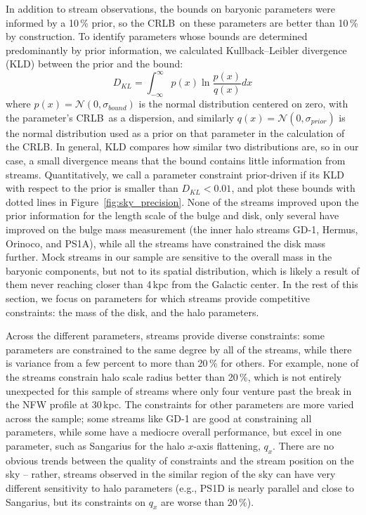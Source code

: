 \documentclass[modern]{aastex61}
\newcommand{\acronym}[1]{{\small{#1}}}
\newcommand{\CRLB}{\acronym{CRLB}}
\begin{document}
In addition to stream observations, the bounds on baryonic parameters were informed by a 10\,\% prior, so the \CRLB\ on these parameters are better than 10\,\% by construction.
To identify parameters whose bounds are determined predominantly by prior information, we calculated Kullback--Leibler divergence (KLD) between the prior and the bound:
\begin{equation*}
D_{KL} = \int_{-\infty}^{\infty} p(x) \ln\frac{p(x)}{q(x)} dx
\end{equation*}
where $p(x) = \mathcal{N}(0,\sigma_{bound})$ is the normal distribution centered on zero, with the parameter's \CRLB\ as a dispersion, and similarly $q(x) = \mathcal{N}(0,\sigma_{prior})$ is the normal distribution used as a prior on that parameter in the calculation of the \CRLB.
In general, KLD compares how similar two distributions are, so in our case, a small divergence means that the bound contains little information from streams.
Quantitatively, we call a parameter constraint prior-driven if its KLD with respect to the prior is smaller than $D_{KL}<0.01$, and plot these bounds with dotted lines in Figure~\ref{fig:sky_precision}.
None of the streams improved upon the prior information for the length scale of the bulge and disk, only several have improved on the bulge mass measurement (the inner halo streams GD-1, Hermus, Orinoco, and PS1A), while all the streams have constrained the disk mass further.
Mock streams in our sample are sensitive to the overall mass in the baryonic components, but not to its spatial distribution, which is likely a result of them never reaching closer than 4\,kpc from the Galactic center.
In the rest of this section, we focus on parameters for which streams provide competitive constraints: the mass of the disk, and the halo parameters.

Across the different parameters, streams provide diverse constraints: some parameters are constrained to the same degree by all of the streams, while there is variance from a few percent to more than 20\,\% for others.
For example, none of the streams constrain halo scale radius better than 20\,\%, which is not entirely unexpected for this sample of streams where only four venture past the break in the NFW profile at 30\,kpc.
The constraints for other parameters are more varied across the sample; some streams like GD-1 are good at constraining all parameters, while some have a mediocre overall performance, but excel in one parameter, such as Sangarius for the halo $x$-axis flattening, $q_x$.
There are no obvious trends between the quality of constraints and the stream position on the sky -- rather, streams observed in the similar region of the sky can have very different sensitivity to halo parameters (e.g., PS1D is nearly parallel and close to Sangarius, but its constraints on $q_x$ are worse than 20\,\%).
\end{document}

